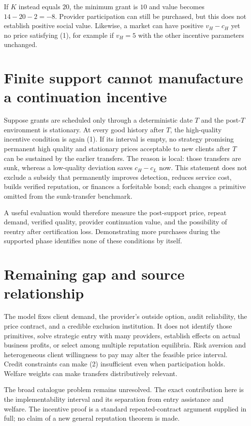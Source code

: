 \documentclass[11pt,a4paper]{article}
\begin{document}
If $K$ instead equals $20$, the minimum grant is $10$ and value becomes $14-20-2=-8$. Provider participation can still be purchased, but this does not establish positive social value. Likewise, a market can have positive $v_H-c_H$ yet no price satisfying (1), for example if $v_H=5$ with the other incentive parameters unchanged.
\section{Finite support cannot manufacture a continuation incentive}
Suppose grants are scheduled only through a deterministic date $T$ and the post-$T$ environment is stationary. At every good history after $T$, the high-quality incentive condition is again (1). If its interval is empty, no strategy promising permanent high quality and stationary prices acceptable to new clients after $T$ can be sustained by the earlier transfers. The reason is local: those transfers are sunk, whereas a low-quality deviation saves $c_H-c_L$ now. This statement does not exclude a subsidy that permanently improves detection, reduces service cost, builds verified reputation, or finances a forfeitable bond; each changes a primitive omitted from the sunk-transfer benchmark.

A useful evaluation would therefore measure the post-support price, repeat demand, verified quality, provider continuation value, and the possibility of reentry after certification loss. Demonstrating more purchases during the supported phase identifies none of these conditions by itself.
\section{Remaining gap and source relationship}
The model fixes client demand, the provider's outside option, audit reliability, the price contract, and a credible exclusion institution. It does not identify those primitives, solve strategic entry with many providers, establish effects on actual business profits, or select among multiple reputation equilibria. Risk aversion and heterogeneous client willingness to pay may alter the feasible price interval. Credit constraints can make (2) insufficient even when participation holds. Welfare weights can make transfers distributively relevant.

The broad catalogue problem remains unresolved. The exact contribution here is the implementability interval and its separation from entry assistance and welfare. The incentive proof is a standard repeated-contract argument supplied in full; no claim of a new general reputation theorem is made.
\end{document}
